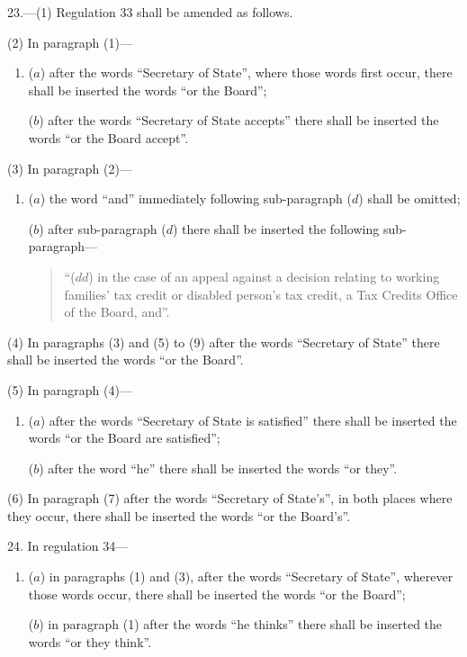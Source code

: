 \documentclass[12pt,a4paper]{article}
\begin{document}
\medskip

23.---(1)  Regulation 33 shall be amended as follows.

(2) In paragraph (1)—
\begin{enumerate}\item[]
($a$) after the words “Secretary of State”, where those words first occur, there shall be inserted the words “or the Board”;

($b$) after the words “Secretary of State accepts” there shall be inserted the words “or the Board accept”.
\end{enumerate}

(3) In paragraph (2)—
\begin{enumerate}\item[]
($a$) the word “and” immediately following sub-paragraph ($d$)  shall be omitted;

($b$) after sub-paragraph ($d$)  there shall be inserted the following sub-paragraph—
\begin{quotation}
“($dd$) in the case of an appeal against a decision relating to working families' tax credit or disabled person’s tax credit, a Tax Credits Office of the Board, and”.
\end{quotation}
\end{enumerate}

(4) In paragraphs (3) and (5) to (9) after the words “Secretary of State” there shall be inserted the words “or the Board”.

(5) In paragraph (4)—
\begin{enumerate}\item[]
($a$) after the words “Secretary of State is satisfied” there shall be inserted the words “or the Board are satisfied”;

($b$) after the word “he” there shall be inserted the words “or they”.
\end{enumerate}

(6) In paragraph (7) after the words “Secretary of State's”, in both places where they occur, there shall be inserted the words “or the Board's”.

\medskip

24.  In regulation 34—
\begin{enumerate}\item[]
($a$) in paragraphs (1) and (3), after the words “Secretary of State”, wherever those words occur, there shall be inserted the words “or the Board”;

($b$) in paragraph (1) after the words “he thinks” there shall be inserted the words “or they think”.
\end{enumerate}
\end{document}
